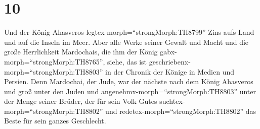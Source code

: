 \hypertarget{section-9}{%
\section{10}\label{section-9}}

 Und der König Ahasveros legtex-morph=``strongMorph:TH8799''
Zins aufs Land und auf die Inseln im Meer.  Aber alle Werke
seiner Gewalt und Macht und die große Herrlichkeit Mardochais, die ihm
der König gabx-morph=``strongMorph:TH8765'', siehe, das ist
geschriebenx-morph=``strongMorph:TH8803'' in der Chronik der Könige in
Medien und Persien.  Denn Mardochai, der Jude, war der
nächste nach dem König Ahasveros und groß unter den Juden und
angenehmx-morph=``strongMorph:TH8803'' unter der Menge seiner Brüder,
der für sein Volk Gutes suchtex-morph=``strongMorph:TH8802'' und
redetex-morph=``strongMorph:TH8802'' das Beste für sein ganzes
Geschlecht.
